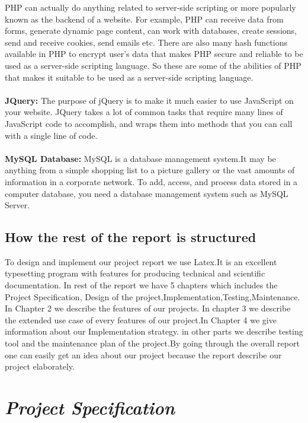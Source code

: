 \documentclass[14pt,a4paper,calibribody]{article}
\begin{document}
PHP can actually do anything related to server-side scripting or more popularly known as the backend of a website. For example, PHP can receive data from forms, generate dynamic page content, can work with databases, create sessions, send and receive cookies, send emails etc. There are also many hash functions available in PHP to encrypt user’s data that makes PHP secure and reliable to be used as a server-side scripting language. So these are some of the abilities of PHP that makes it suitable to be used as a server-side scripting language. \\\\
\textbf{JQuery:} The purpose of jQuery is to make it much easier to use JavaScript on your website. JQuery takes a lot of common tasks that require many lines of JavaScript code to accomplish, and wraps them into methods that you can call with a single line of code.\\\\
\textbf{MySQL Database:} MySQL is a database management system.It may be anything from a simple shopping list to a picture gallery or the vast amounts of information in a corporate network. To add, access, and process data stored in a computer database, you need a database management system such as MySQL Server.\\

\subsection{How the rest of the report is structured}
To design and implement our project report we use Latex.It is an excellent typesetting program with features for producing technical and scientific documentation. In rest of the report we have 5 chapters which includes the Project Specification, Design of the project,Implementation,Testing,Maintenance. In Chapter 2 we describe the features of our projects. In chapter 3 we describe the extended use case of every features of our project.In Chapter 4 we give information about our Implementation strategy. in other  parts we describe testing tool and the maintenance plan of the project.By going through the overall report one can easily get an idea about our project because the report describe our project elaborately.

\clearpage  
\section{\emph{\large{Project Specification }}}
\end{document}
